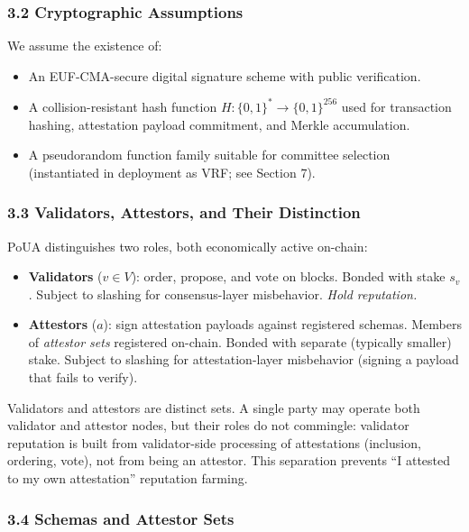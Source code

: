 \documentclass[
  11pt,
]{article}
\providecommand{\tightlist}{%
  \setlength{\itemsep}{0pt}\setlength{\parskip}{0pt}}
\begin{document}
\subsubsection{3.2 Cryptographic
Assumptions}\label{cryptographic-assumptions}

We assume the existence of:

\begin{itemize}
\tightlist
\item
  An EUF-CMA-secure digital signature scheme with public verification.
\item
  A collision-resistant hash function
  \(H : \{0,1\}^* \to \{0,1\}^{256}\) used for transaction hashing,
  attestation payload commitment, and Merkle accumulation.
\item
  A pseudorandom function family suitable for committee selection
  (instantiated in deployment as VRF; see Section 7).
\end{itemize}

\subsubsection{3.3 Validators, Attestors, and Their
Distinction}\label{validators-attestors-and-their-distinction}

PoUA distinguishes two roles, both economically active on-chain:

\begin{itemize}
\tightlist
\item
  \textbf{Validators} (\(v \in V\)): order, propose, and vote on blocks.
  Bonded with stake \(s_v\). Subject to slashing for consensus-layer
  misbehavior. \emph{Hold reputation.}
\item
  \textbf{Attestors} (\(a\)): sign attestation payloads against
  registered schemas. Members of \emph{attestor sets} registered
  on-chain. Bonded with separate (typically smaller) stake. Subject to
  slashing for attestation-layer misbehavior (signing a payload that
  fails to verify).
\end{itemize}

Validators and attestors are distinct sets. A single party may operate
both validator and attestor nodes, but their roles do not commingle:
validator reputation is built from validator-side processing of
attestations (inclusion, ordering, vote), not from being an attestor.
This separation prevents ``I attested to my own attestation'' reputation
farming.

\subsubsection{3.4 Schemas and Attestor
Sets}\label{schemas-and-attestor-sets}
\end{document}
